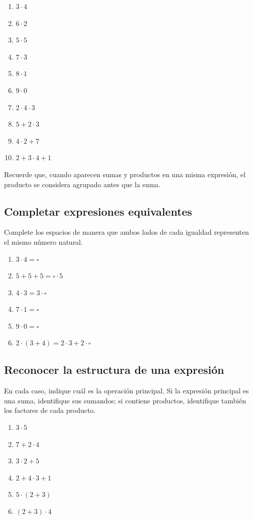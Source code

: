 \begin{enumerate}
\item \(3\cdot4\)
\item \(6\cdot2\)
\item \(5\cdot5\)
\item \(7\cdot3\)
\item \(8\cdot1\)
\item \(9\cdot0\)
\item \(2\cdot4\cdot3\)
\item \(5+2\cdot3\)
\item \(4\cdot2+7\)
\item \(2+3\cdot4+1\)
\end{enumerate}

Recuerde que, cuando aparecen sumas y productos en una misma expresión, el producto se considera agrupado antes que la suma.

\subsection*{Completar expresiones equivalentes}

Complete los espacios de manera que ambos lados de cada igualdad representen el mismo número natural.

\begin{enumerate}
\item \(3\cdot4=\square\)
\item \(5+5+5=\square\cdot5\)
\item \(4\cdot3=3\cdot\square\)
\item \(7\cdot1=\square\)
\item \(9\cdot0=\square\)
\item \(2\cdot(3+4)=2\cdot3+2\cdot\square\)
\end{enumerate}

\subsection*{Reconocer la estructura de una expresión}

En cada caso, indique cuál es la operación principal. Si la expresión principal es una suma, identifique sus sumandos; si contiene productos, identifique también los factores de cada producto.

\begin{enumerate}
\item \(3\cdot5\)
\item \(7+2\cdot4\)
\item \(3\cdot2+5\)
\item \(2+4\cdot3+1\)
\item \(5\cdot(2+3)\)
\item \((2+3)\cdot4\)
\end{enumerate}

